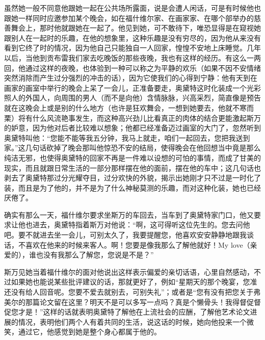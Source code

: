 \par 虽然她一般不同意他跟她一起在公共场所露面，说是会遭人闲话，可是有时候他也跟她一样同时应邀参加某个晚会，如在福什维尔家、在画家家、在哪个部举办的慈善舞会上，那时他就跟她在一起了。他见到她，可不敢待下，唯恐显得是在窥视她跟别人在一起时的乐趣，在他的想象里，这种乐趣是没有穷尽的，因为他从来没有看到它终了时的情况，因为他自己只能独自一人回家，惶惶不安地上床睡觉。几年以后，当他到贡布雷我们家去吃晚饭的那些夜晚，我也有这样的经历。有这么一两回，他通过这样的夜晚，也体验到一种可以称之为平静的欢乐（如果不因不安情绪突然消除而产生过分强烈的冲击的话），因为它使我们的心得到宁静：他有天到在画家的画室中举行的晚会上呆了一会儿，正准备要走，奥黛特这时化装成一个光彩照人的外国人，向周围的男人（而不是向他）含情脉脉，兴高采烈，简直像是预告就在这晚会上或是别的什么地方（也许是狂欢舞会，一想到她要去，他就不寒而栗）将有什么风流艳事发生，而这种高兴劲儿比看真正的肉体的结合更能激起斯万的妒意，因为他对后者比较难以想象；他都已经准备迈过画室的大门了，忽然听到奥黛特叫他：“您能不能等我五分钟，我马上就走，咱们一起回去，您把我送到家。”这几句话砍掉了晚会那叫他惊恐不安的结局，使得晚会在他回想当中竟是那么纯洁无邪，也使得奥黛特的回家不再是一件难以设想的可怕的事情，而成了甘美的现实，而且就跟日常生活的一部分那样摆在他的面前，摆在他的车中；这几句话也剥去了奥黛特那过分光耀夺目，过分欢快的外貌，揭示出她刚才只不过是一时化了装，而且是为了他的，并不是为了什么神秘莫测的乐趣，而对这种化装，她也已经厌倦了。
\par 确实有那么一天，福什维尔要求坐斯万的车回去，当车到了奥黛特家门口，他又要求让他也进去，奥黛特指着斯万对他说：“啊，这可得听这位先生的。您去问他吧。要不就进去坐一会儿，可别太久了，我要提醒您，他喜欢安安静静地跟我谈话，不喜欢在他来的时候来客人。啊！您要是像我那么了解他就好！My love（亲爱的），谁也没有我那么了解您，您说是不是？”
\par 斯万见她当着福什维尔的面对他说出这样表示偏爱的亲切话语，心里自然感动，不过如果她也能说某些批评建议的话，那就更好了，例如“星期天的那个晚宴，您准还没有给人回音呢。您要不爱去就别去，可别失礼”；或者是“您有没有把您关于弗美尔的那篇论文留在这里？明天不是可以多写一点吗？真是个懒骨头！我得督促督促您才是！”这样的话就表明奥黛特了解他在上流社会的应酬，了解他艺术论文进展的情况，表明他们两个人有着共同的生活，说这话的时候，她向他投来一个微笑，通过它，他感觉到她是整个身心都属于他的。
